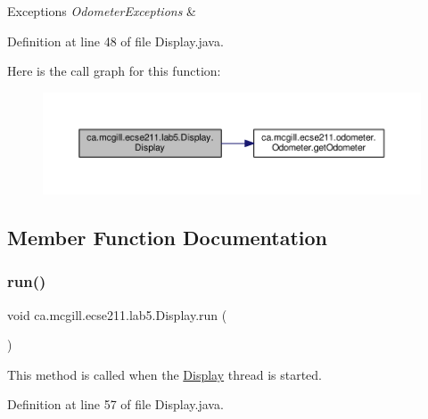 \begin{DoxyExceptions}{Exceptions}
{\em Odometer\+Exceptions} & \\
\hline
\end{DoxyExceptions}


Definition at line 48 of file Display.\+java.

Here is the call graph for this function\+:\nopagebreak
\begin{figure}[H]
\begin{center}
\leavevmode
\includegraphics[width=350pt]{classca_1_1mcgill_1_1ecse211_1_1lab5_1_1_display_abb1c01962b84cfad6ff897ce490b365a_cgraph}
\end{center}
\end{figure}


\subsection{Member Function Documentation}
\mbox{\label{classca_1_1mcgill_1_1ecse211_1_1lab5_1_1_display_a047e885f7170ba80f60fd3b4b2bc79a9}} 
\subsubsection{\texorpdfstring{run()}{run()}}
{\footnotesize\ttfamily void ca.\+mcgill.\+ecse211.\+lab5.\+Display.\+run (\begin{DoxyParamCaption}{ }\end{DoxyParamCaption})}

This method is called when the \hyperlink{classca_1_1mcgill_1_1ecse211_1_1lab5_1_1_display}{Display} thread is started. 

Definition at line 57 of file Display.\+java.

